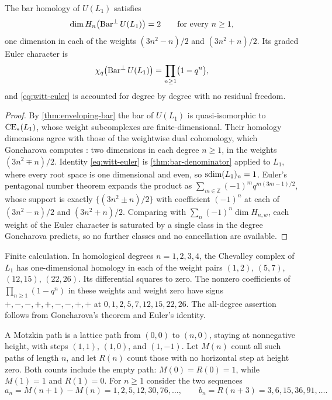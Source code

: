 \begin{theorem}\label{thm:pentagonal}
The bar homology of \(U(L_1)\) satisfies
\[
 \dim H_n\bigl(\operatorname{Bar}^{\perp}U(L_1)\bigr)=2
 \qquad\text{for every }n\ge1,
\]
one dimension in each of the weights \((3n^2-n)/2\) and \((3n^2+n)/2\).  Its
graded Euler character is
\begin{equation}\label{eq:witt-euler}
 \chi_q\bigl(\operatorname{Bar}^{\perp}U(L_1)\bigr)=\prod_{n\ge1}\bigl(1-q^n\bigr),
\end{equation}
and \eqref{eq:witt-euler} is accounted for degree by degree with no residual
freedom.
\end{theorem}
\begin{proof}
By \cref{thm:enveloping-bar} the bar of \(U(L_1)\) is quasi-isomorphic to \(\operatorname{CE}_*(L_1)\), whose
weight subcomplexes are finite-dimensional. Their homology dimensions agree
with those of the weightwise dual cohomology, which Goncharova computes
\cite{Goncharova1973}: two dimensions in each degree \(n\ge1\), in the
weights \((3n^2\mp n)/2\).  Identity \eqref{eq:witt-euler} is
\cref{thm:bar-denominator} applied to \(L_1\), where every root space is one
dimensional and even, so \(\operatorname{sdim}(L_1)_n=1\).  Euler's pentagonal number theorem
expands the product as \(\sum_{m\in\mathbb Z}(-1)^mq^{m(3m-1)/2}\), whose support
is exactly \(\{(3n^2\pm n)/2\}\) with coefficient \((-1)^n\) at each of
\((3n^2-n)/2\) and \((3n^2+n)/2\).  Comparing with \(\sum_n(-1)^n\dim H_{n,w}\),
each weight of the Euler character is saturated by a single class in the degree
Goncharova predicts, so no further classes and no cancellation are available.
\end{proof}

\begin{statusbox}
Finite calculation. In homological degrees $n=1,2,3,4$, the Chevalley complex of $L_1$ has one-dimensional homology in each of the weight pairs $(1,2)$, $(5,7)$, $(12,15)$, $(22,26)$. Its differential squares to zero. The nonzero coefficients of $\prod_{n\ge1}(1-q^n)$ in these weights and weight zero have signs $+,-,-,+,+,-,-,+,+$ at $0,1,2,5,7,12,15,22,26$. The all-degree assertion follows from Goncharova's theorem and Euler's identity.
\end{statusbox}

A Motzkin path is a lattice path from $(0,0)$ to $(n,0)$, staying at
nonnegative height, with steps $(1,1)$, $(1,0)$, and $(1,-1)$.
Let $M(n)$ count all such paths of length $n$, and let $R(n)$ count those with
no horizontal step at height zero.  Both counts include the empty path:
$M(0)=R(0)=1$, while $M(1)=1$ and $R(1)=0$.
For $n\ge1$ consider the two sequences
\[
 a_n=M(n+1)-M(n)=1,2,5,12,30,76,\ldots,
 \qquad
 b_n=R(n+3)=3,6,15,36,91,\ldots.
\]

